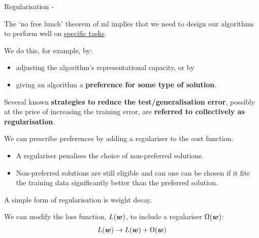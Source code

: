 
\begin{frame}[t,allowframebreaks]{Regularisation -}

The `no free lunch' theorem of \gls{ml} implies that we
need to design our algorithms 
to perform well on \underline{specific tasks}.

\vspace{0.2cm}

We do this, for example, by:
\begin{itemize}
    \item adjusting the algorithm's 
    \gls{representational capacity}, or by    
    \item giving an algorithm a 
    {\bf preference for some type of solution}.
\end{itemize}

\vspace{0.2cm}

Several known {\bf strategies to reduce the test/generalisation error},
possibly at the price of increasing the training error,
are {\bf referred to collectively as
\gls{regularisation}}.

{\color{red} \tiny
We can prescribe preferences by adding a 
\gls{regulariser} to the 
\gls{cost function}.

\begin{itemize}
 \item A \gls{regulariser} penalises the choice of non-preferred solutions.
 \item Non-preferred solutions are still eligible and 
 can one can be chosen if it fits the training data significantly 
 better than the preferred solution.
\end{itemize}
}


\framebreak

%
%

A simple form of \gls{regularisation} is 
\gls{weight decay}.\\
\vspace{0.2cm}

We can modify the loss function, $L(\boldsymbol{w})$, 
to include a \gls{regulariser} $\Omega(\boldsymbol{w})$:
\begin{equation}
    L(\boldsymbol{w}) \rightarrow L(\boldsymbol{w}) + \Omega(\boldsymbol{w})
\end{equation}\\


\end{frame}
